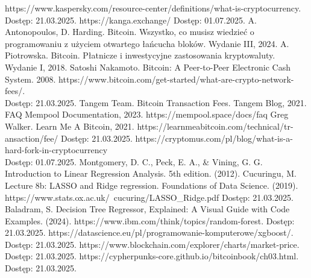 \documentclass[12pt,a4paper]{report}
\theoremstyle{definition} %
\begin{document}
	\begin{thebibliography}{3}
		 https://www.kaspersky.com/resource-center/definitions/what-is-cryptocurrency. Dostęp: 21.03.2025.
		 https://kanga.exchange/ Dostęp: 01.07.2025.
		 A. Antonopoulos, D. Harding. Bitcoin. Wszystko, co musisz wiedzieć o programowaniu z użyciem otwartego łańcucha bloków. Wydanie III, 2024.
		 A. Piotrowska. 	Bitcoin. Płatnicze i inwestycyjne zastosowania kryptowaluty. Wydanie I, 2018.
		 Satoshi Nakamoto. Bitcoin: A Peer-to-Peer Electronic Cash System. 2008.
		 https://www.bitcoin.com/get-started/what-are-crypto-network-fees/. \\Dostęp: 21.03.2025.
		 Tangem Team. Bitcoin Transaction Fees. Tangem Blog, 2021. 
		 FAQ Mempool Documentation, 2023. https://mempool.space/docs/faq
		 Greg Walker. Learn Me A Bitcoin, 2021. https://learnmeabitcoin.com/technical/tr- ansaction/fee/ Dostęp: 21.03.2025.
		 https://cryptomus.com/pl/blog/what-is-a-hard-fork-in-cryptocurrency \\Dostęp: 01.07.2025.
		 Montgomery, D. C., Peck, E. A., \& Vining, G. G. Introduction to Linear Regression Analysis. 5th edition. (2012).
		 Cucuringu, M. Lecture 8b: LASSO and Ridge regression. Foundations of Data Science. (2019). https://www.stats.ox.ac.uk/~cucuring/LASSO\_Ridge.pdf Dostęp: 21.03.2025.
		 Baladram, S. Decision Tree Regressor, Explained: A Visual Guide with Code Examples. (2024).
		 https://www.ibm.com/think/topics/random-forest. Dostęp: 21.03.2025.
		 https://datascience.eu/pl/programowanie-komputerowe/xgboost/. \\Dostęp: 21.03.2025.
		https://www.blockchain.com/explorer/charts/market-price. Dostęp: 21.03.2025.
		https://cypherpunks-core.github.io/bitcoinbook/ch03.html. Dostęp: 21.03.2025.
	\end{thebibliography}
	
	
	
	
\end{document}
